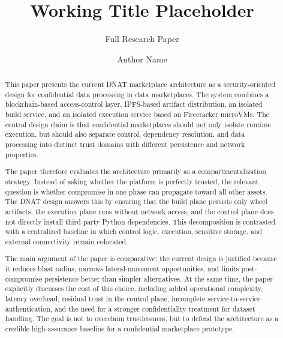 \documentclass[sigconf,nonacm]{acmart}
\begin{document}
\title{Working Title Placeholder}
\subtitle{Full Research Paper}

\author{Author Name}

\begin{abstract}
This paper presents the current DNAT marketplace architecture as a security-oriented design for confidential data processing in data marketplaces. The system combines a blockchain-based access-control layer, IPFS-based artifact distribution, an isolated build service, and an isolated execution service based on Firecracker microVMs. The central design claim is that confidential marketplaces should not only isolate runtime execution, but should also separate control, dependency resolution, and data processing into distinct trust domains with different persistence and network properties.

The paper therefore evaluates the architecture primarily as a compartmentalization strategy. Instead of asking whether the platform is perfectly trusted, the relevant question is whether compromise in one phase can propagate toward all other assets. The DNAT design answers this by ensuring that the build plane persists only wheel artifacts, the execution plane runs without network access, and the control plane does not directly install third-party Python dependencies. This decomposition is contrasted with a centralized baseline in which control logic, execution, sensitive storage, and external connectivity remain colocated.

The main argument of the paper is comparative: the current design is justified because it reduces blast radius, narrows lateral-movement opportunities, and limits post-compromise persistence better than simpler alternatives. At the same time, the paper explicitly discusses the cost of this choice, including added operational complexity, latency overhead, residual trust in the control plane, incomplete service-to-service authentication, and the need for a stronger confidentiality treatment for dataset handling. The goal is not to overclaim trustlessness, but to defend the architecture as a credible high-assurance baseline for a confidential marketplace prototype.
\end{abstract}


\maketitle
\end{document}
